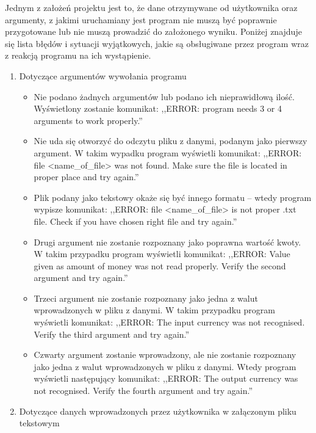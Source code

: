 \documentclass[a4paper,11pt]{article}
\newcommand\tab[1][0.6cm]{\hspace*{#1}}
\begin{document}
\tab Jednym z założeń projektu jest to, że dane otrzymywane od użytkownika oraz argumenty, z jakimi uruchamiany jest program nie muszą być poprawnie przygotowane lub nie muszą prowadzić do założonego wyniku. Poniżej znajduje się lista błędów i sytuacji wyjątkowych, jakie są obsługiwane przez program wraz z reakcją programu na ich wystąpienie.

\begin{enumerate}

\item Dotyczące argumentów wywołania programu
\begin{itemize}

\item Nie podano żadnych argumentów lub podano ich nieprawidłową ilość. Wyświetlony zostanie komunikat: ,,ERROR: program needs 3 or 4 arguments to work properly.''

\item Nie uda się otworzyć do odczytu pliku z danymi, podanym jako pierwszy argument. W takim wypadku program wyświetli komunikat: ,,ERROR: file <name\_of\_file> was not found. Make sure the file is located in proper place and try again.''

\item Plik podany jako tekstowy okaże się być innego formatu -- wtedy program wypisze komunikat: ,,ERROR: file <name\_of\_file> is not proper .txt file. Check if you have chosen right file and try again.''

\item Drugi argument nie zostanie rozpoznany jako poprawna wartość kwoty. W takim przypadku program wyświetli komunikat: ,,ERROR: Value given as amount of money was not read properly. Verify the second argument and try again.''

\item Trzeci argument nie zostanie rozpoznany jako jedna z walut wprowadzonych w pliku z danymi. W takim przypadku program wyświetli komunikat: ,,ERROR: The input currency was not recognised. Verify the third argument and try again.''

\item Czwarty argument zostanie wprowadzony, ale nie zostanie rozpoznany jako jedna z walut wprowadzonych w pliku z danymi. Wtedy program wyświetli następujący komunikat: ,,ERROR: The output currency was not recognised. Verify the fourth argument and try again.''

\end{itemize}

\item Dotyczące danych wprowadzonych przez użytkownika w załączonym pliku tekstowym


\end{enumerate}
\end{document}
